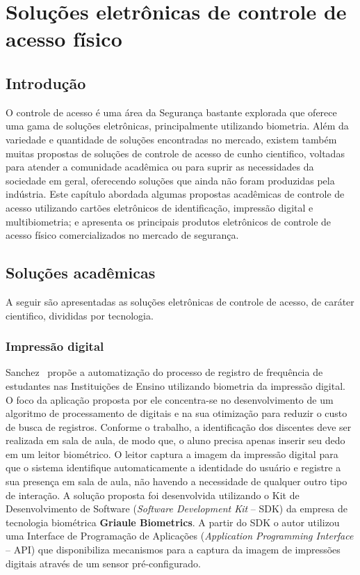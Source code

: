 \chapter{Soluções eletrônicas de controle de acesso físico \label{cap:estadodaarte}}


\section{Introdução}

O controle de acesso é uma área da Segurança bastante explorada que oferece uma gama de soluções eletrônicas, principalmente utilizando biometria. Além da variedade e quantidade de soluções encontradas no mercado, existem também muitas propostas de soluções de controle de acesso de cunho cientifico, voltadas para atender a comunidade acadêmica ou para suprir as necessidades da sociedade em geral, oferecendo soluções que ainda não foram produzidas pela indústria. Este capítulo abordada algumas propostas acadêmicas de controle de acesso utilizando cartões eletrônicos de identificação, impressão digital e multibiometria; e apresenta os principais produtos eletrônicos de controle de acesso físico comercializados no mercado de segurança. 


\section{Soluções acadêmicas \label{solucoes_academicas}}
A seguir são apresentadas as soluções eletrônicas de controle de acesso, de caráter cientifico, divididas por tecnologia.



\subsection{Impressão digital}

 Sanchez~\cite{sanchez2011registro} propõe a automatização do processo de registro de frequência de estudantes nas Instituições de Ensino utilizando biometria da impressão digital. O foco da aplicação proposta por ele concentra-se no desenvolvimento de um algoritmo de processamento de digitais e na sua otimização para reduzir o custo de busca de registros. 
 Conforme o trabalho, a identificação dos discentes deve ser realizada em sala de aula, de modo que, o aluno precisa apenas inserir seu dedo em um leitor biométrico. O leitor captura a imagem da impressão digital para que o sistema identifique automaticamente a identidade do usuário e registre a sua presença em sala de aula, não havendo a necessidade de qualquer outro tipo de interação. A solução proposta foi desenvolvida utilizando o Kit de Desenvolvimento de Software (\textit{Software Development Kit} -- SDK) da empresa de tecnologia biométrica \textbf{Griaule Biometrics}. A partir do SDK o autor utilizou uma Interface de Programação de Aplicações (\textit{Application Programming Interface} -- API) que disponibiliza mecanismos para a captura da imagem de impressões digitais através de um sensor pré-configurado. 
 
